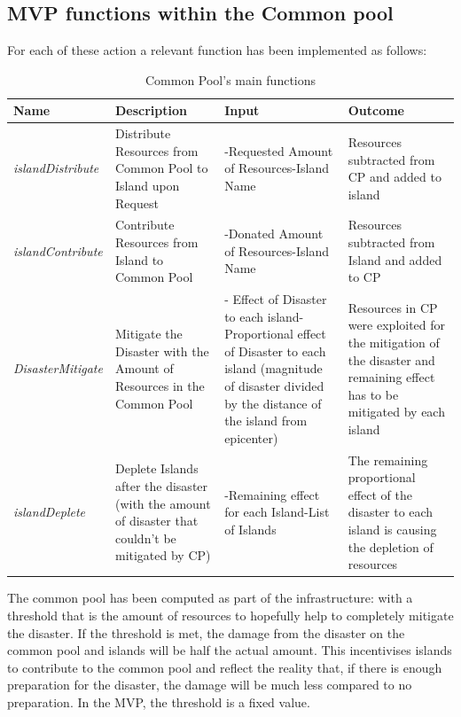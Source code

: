 \newpage
\subsection{MVP functions within the Common pool}

For each of these action a relevant function has been implemented as follows:\\

\begin{table}[h]
\begin{center}
\begin{tabular}
{|p{1.1in}|p{1.1in}|p{1.1in}|p{1.1in}|} \hline
\textbf{Name} & \textbf{Description} & \textbf{Input} & \textbf{Outcome} \\ \hline
\textit{islandDistribute} & Distribute Resources from Common Pool to Island upon Request & -Requested Amount of Resources\newline -Island Name & Resources subtracted from CP and added to island \\ \hline
\textit{islandContribute} & Contribute Resources from Island to Common Pool & -Donated Amount of Resources\newline -Island Name & Resources subtracted from Island and added to CP \\ \hline
\textit{DisasterMitigate} & Mitigate the Disaster with the Amount of Resources in the Common Pool & - Effect of Disaster to each island\newline - Proportional effect of Disaster to each island (magnitude of disaster divided by the distance of the island from epicenter) & Resources in CP were exploited for the mitigation of the disaster and remaining effect has to be mitigated by each island \\ \hline
\textit{islandDeplete} & Deplete Islands after the disaster (with the amount of disaster that couldn't be mitigated by CP) & -Remaining effect for each Island\newline -List of Islands & The remaining proportional effect of the disaster to each island is causing the depletion of resources \\ \hline
\end{tabular}
\caption{\label{tab:table-name}Common Pool's main functions}
\end{center}
\end{table}

The common pool has been computed as part of the infrastructure: with a threshold that is the amount of resources to hopefully help to completely mitigate the disaster. If the threshold is met, the damage from the disaster on the common pool and islands will be half the actual amount. This incentivises islands to contribute to the common pool and reflect the reality that, if there is enough preparation for the disaster, the damage will be much less compared to no preparation. In the MVP, the threshold is a fixed value.\\

